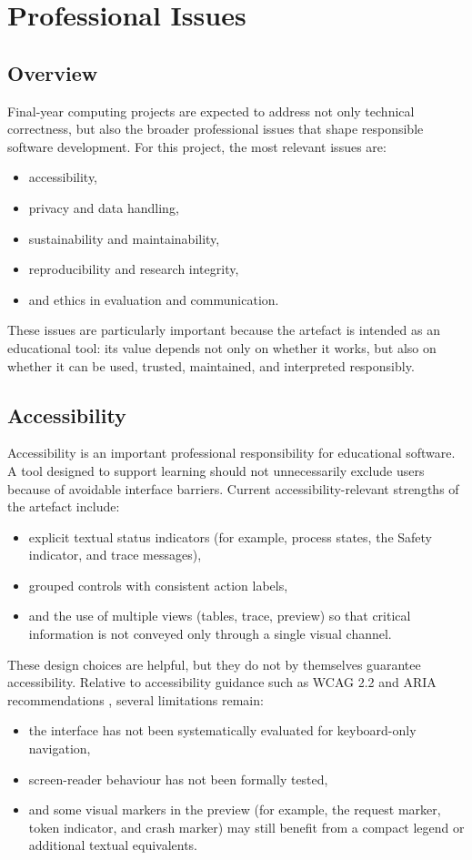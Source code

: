 \chapter{Professional Issues}
\label{ch:professional}

\section{Overview}
Final-year computing projects are expected to address not only technical correctness, but also the broader professional issues that shape responsible software development. For this project, the most relevant issues are:
\begin{itemize}
  \item accessibility,
  \item privacy and data handling,
  \item sustainability and maintainability,
  \item reproducibility and research integrity,
  \item and ethics in evaluation and communication.
\end{itemize}

These issues are particularly important because the artefact is intended as an educational tool: its value depends not only on whether it works, but also on whether it can be used, trusted, maintained, and interpreted responsibly.

\section{Accessibility}
Accessibility is an important professional responsibility for educational software. A tool designed to support learning should not unnecessarily exclude users because of avoidable interface barriers. Current accessibility-relevant strengths of the artefact include:
\begin{itemize}
  \item explicit textual status indicators (for example, process states, the Safety indicator, and trace messages),
  \item grouped controls with consistent action labels,
  \item and the use of multiple views (tables, trace, preview) so that critical information is not conveyed only through a single visual channel.
\end{itemize}

These design choices are helpful, but they do not by themselves guarantee accessibility. Relative to accessibility guidance such as WCAG 2.2 and ARIA recommendations \cite{w3c_wcag22,w3c_aria12}, several limitations remain:
\begin{itemize}
  \item the interface has not been systematically evaluated for keyboard-only navigation,
  \item screen-reader behaviour has not been formally tested,
  \item and some visual markers in the preview (for example, the request marker, token indicator, and crash marker) may still benefit from a compact legend or additional textual equivalents.
\end{itemize}

